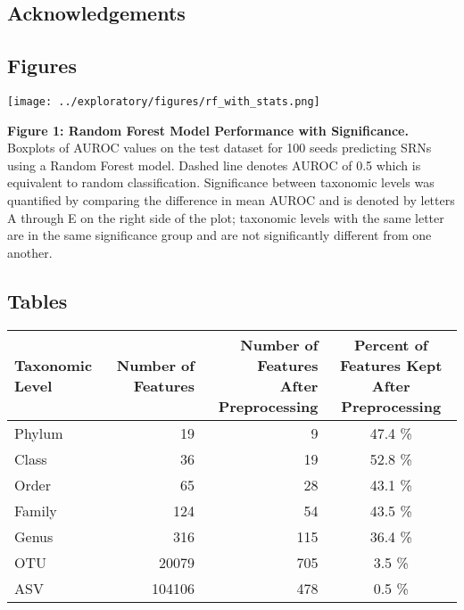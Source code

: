 \documentclass[
]{article}
\begin{document}
\hypertarget{acknowledgements}{%
\subsection{Acknowledgements}\label{acknowledgements}}

\newpage

\hypertarget{figures}{%
\subsection{Figures}\label{figures}}

\texttt{[image: ../exploratory/figures/rf\_with\_stats.png]}

\textbf{Figure 1: Random Forest Model Performance with Significance.}
Boxplots of AUROC values on the test dataset for 100 seeds predicting
SRNs using a Random Forest model. Dashed line denotes AUROC of 0.5 which
is equivalent to random classification. Significance between taxonomic
levels was quantified by comparing the difference in mean AUROC and is
denoted by letters A through E on the right side of the plot; taxonomic
levels with the same letter are in the same significance group and are
not significantly different from one another.

\newpage

\hypertarget{tables}{%
\subsection{Tables}\label{tables}}

\begin{longtable}[]{@{}lrrc@{}}
\toprule
Taxonomic Level & Number of Features &
\makecell[c]{Number of Features \\ After Preprocessing} &
\makecell[c]{Percent of Features Kept \\ After Preprocessing} \\
\midrule
\endhead
Phylum & 19 & 9 & 47.4 \% \\
Class & 36 & 19 & 52.8 \% \\
Order & 65 & 28 & 43.1 \% \\
Family & 124 & 54 & 43.5 \% \\
Genus & 316 & 115 & 36.4 \% \\
OTU & 20079 & 705 & 3.5 \% \\
ASV & 104106 & 478 & 0.5 \% \\
\bottomrule
\end{longtable}
\end{document}
